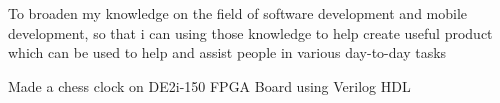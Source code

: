 \documentclass[a4paper,12pt]{memoir} %
\begin{document}
\userinformation %

\framebreak %






To broaden my knowledge on the field of software development and mobile development, so that i can using those knowledge to help create useful product which can be used to help and assist people in various day-to-day tasks 
\Sep






\Sep %



\bluebullet Made a chess clock on DE2i-150 FPGA Board using Verilog HDL
\end{document}

